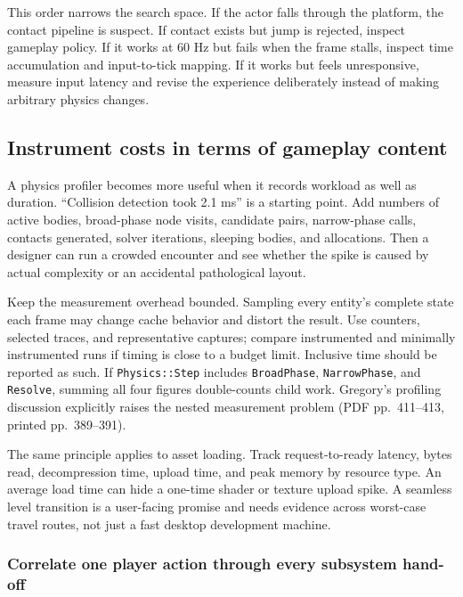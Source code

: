 This order narrows the search space. If the actor falls through the platform, the contact pipeline is suspect. If contact exists but jump is rejected, inspect gameplay policy. If it works at 60 Hz but fails when the frame stalls, inspect time accumulation and input-to-tick mapping. If it works but feels unresponsive, measure input latency and revise the experience deliberately instead of making arbitrary physics changes.

\subsection{Instrument costs in terms of gameplay content}\label{06-engine-ii-ch041-instrument-costs-in-terms-of-gameplay-content}

A physics profiler becomes more useful when it records workload as well as duration. ``Collision detection took 2.1 ms'' is a starting point. Add numbers of active bodies, broad-phase node visits, candidate pairs, narrow-phase calls, contacts generated, solver iterations, sleeping bodies, and allocations. Then a designer can run a crowded encounter and see whether the spike is caused by actual complexity or an accidental pathological layout.

Keep the measurement overhead bounded. Sampling every entity's complete state each frame may change cache behavior and distort the result. Use counters, selected traces, and representative captures; compare instrumented and minimally instrumented runs if timing is close to a budget limit. Inclusive time should be reported as such. If \texttt{Physics::Step} includes \texttt{BroadPhase}, \texttt{NarrowPhase}, and \texttt{Resolve}, summing all four figures double-counts child work. Gregory's profiling discussion explicitly raises the nested measurement problem (PDF pp.~411--413, printed pp.~389--391).

The same principle applies to asset loading. Track request-to-ready latency, bytes read, decompression time, upload time, and peak memory by resource type. An average load time can hide a one-time shader or texture upload spike. A seamless level transition is a user-facing promise and needs evidence across worst-case travel routes, not just a fast desktop development machine.

\subsubsection{Correlate one player action through every subsystem hand-off}\label{06-engine-ii-ch041-correlate-one-player-action-through-every-subsystem-hand-off}

